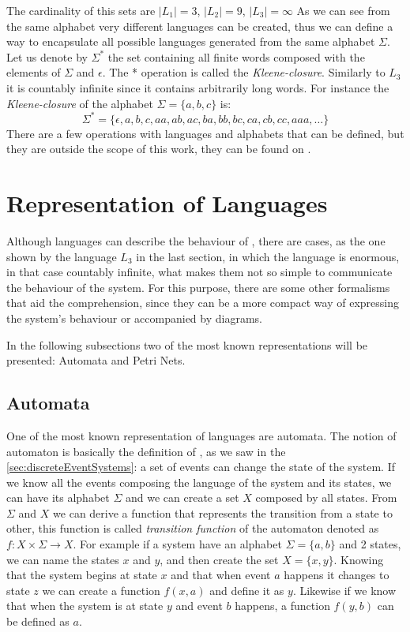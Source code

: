 The cardinality of this sets are $|L_1|=3$, $|L_2|=9$, $|L_3|=\infty$
As we can see from the same alphabet very different languages can be created, thus we can define a way to encapsulate all possible languages generated from
the same alphabet $\Sigma$. Let us denote by $\Sigma^*$ the set containing all
finite words composed with the elements of $\Sigma$ and $\epsilon$. The *
operation is called the \textit{Kleene-closure}. Similarly to $L_3$ it is
countably infinite since it contains arbitrarily long words. For instance the
\textit{Kleene-closure} of the alphabet $\Sigma = \{a, b, c\}$ is:
\begin{equation*}
  \label{eq:kleeneExample}
  \Sigma^* = \{\epsilon,a,b,c,aa,ab,ac,ba,bb,bc,ca,cb,cc,aaa,\dots\} 
\end{equation*}
There are a few operations with languages and alphabets that can be defined, but they are outside the scope of this work, they can be found on \cite{cassandras2009introduction}.
\section{Representation of Languages}
\label{sec:representationLanguages}

Although languages can describe the behaviour of \DESs, there are cases, as the
one shown
by the language $L_3$ in the last section, in which the language is enormous, in
that case countably infinite, what makes them not so simple to communicate the
behaviour of the system. For this purpose, there are some other formalisms that
aid the comprehension, since they can be a more compact way of expressing the
system's behaviour or accompanied by diagrams.

In the following subsections two of the most known representations will be
presented: Automata and Petri Nets.

\subsection{Automata}
\label{sec:automata}
One of the most known representation of languages are automata. The notion of
automaton is basically the definition of \DESs, as we saw in the
\autoref{sec:discreteEventSystems}: a set of events can change the state of the
system. If we know all the events composing the language of the
system and its states, we can have its alphabet $\Sigma$ and we can create a set $X$ composed
by all states.
From $\Sigma$ and $X$ we can derive a function that represents the transition
from a state to other, this function is called \emph{transition function} of the automaton
denoted as $f : X \times \Sigma \rightarrow X$. For example if a system have an
alphabet $\Sigma = \{a,b\}$ and 2 states, we can name the states $x$ and
$y$, and then create the set $X = \{x,y\}$. Knowing that the system begins at state $x$
and that when event $a$ happens it changes to state $z$ we can create a function
$f(x,a)$ and define it as $y$. Likewise if we know that when the system is at
state $y$ and event $b$ happens, a function $f(y,b)$ can be defined as $a$.

